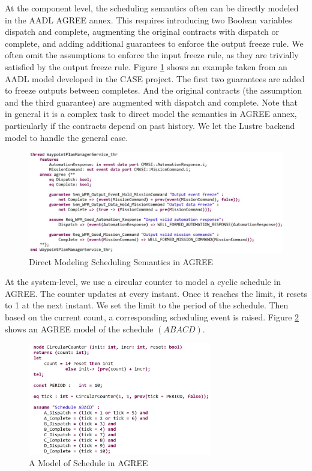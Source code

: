 At the component level, the scheduling semantics often can be directly modeled in the AADL AGREE annex. This requires introducing two Boolean variables dispatch and complete, augmenting the original contracts with dispatch or complete, and adding additional guarantees to enforce the output freeze rule. We often omit the assumptions to enforce the input freeze rule, as they are trivially satisfied by the output freeze rule.
Figure \ref{wpmAGREE} shows an example taken from an AADL model developed in the CASE project. The first two guarantees are added to freeze outputs between completes. And the original contracts (the assumption and the third guarantee) are augmented with dispatch and complete.
Note that in general it is a complex task to direct model the semantics in AGREE annex, particularly if the contracts depend on past history. We let the Lustre backend model to handle the general case.

\begin{figure}[ht!]
\centering
\includegraphics[width=130mm]{wpmAGREE3.jpg}
\caption{Direct Modeling Scheduling Semantics in AGREE\label{wpmAGREE}}
\end{figure}

At the system-level, we use a circular counter to model a cyclic schedule in AGREE. 
The counter updates at every instant. Once it reaches the limit, it resets to 1 at the next instant.
We set the limit to the period of the schedule. 
Then based on the current count, a corresponding scheduling event is raised.
Figure \ref{schedule} shows an AGREE model of the schedule $(ABACD)$.

\begin{figure}[ht!]
\centering
\includegraphics[width=80mm]{schedule.jpg}
\caption{A Model of Schedule in AGREE\label{schedule}}
\end{figure}

